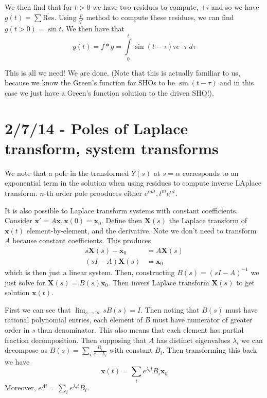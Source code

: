 \documentclass[10pt]{report}
\newcommand{\Res}[0]{\mathrm{Res} }
\begin{document}
We then find that for $t > 0$ we have two residues to compute, $\pm i$ and so we have $g(t) = \sum \Res$. Using $\frac{p}{q'}$ method to compute these residues, we can find $g(t > 0) = \sin t$. We then have that
\begin{equation}
    y(t) = f*g = \displaystyle\int\limits_{0}^{t}\sin(t-\tau) \tau e^-\tau\;d\tau
\end{equation}

This is all we need! We are done. (Note that this is actually familiar to us, because we know the Green's function for SHOs to be $\sin(t-\tau)$ and in this case we just have a Green's function solution to the driven SHO!).


\chapter{2/7/14 - Poles of Laplace transform, system transforms}

We note that a pole in the transformed $Y(s)$ at $s=\alpha$ corresponds to an exponential term in the solution when using residues to compute inverse LAplace transform. $n$-th order pole prooduces either $e^{\alpha at}, t^me^{\alpha t}$.

It is also possible to Laplace transform systems with constant coefficients. Consider $\mathbf{x}' = A\mathbf{x}, \mathbf{x}(0) = \mathbf{x}_0$. Define then $\mathbf{X}(s)$ the Laplace transform of $\mathbf{x}(t)$ element-by-element, and the derivative. Note we don't need to transform $A$ because constant coefficients. This produces
\begin{align}
    s\mathbf{X}(s) - \mathbf{x}_0 &= A\mathbf{X}(s)\\
    (sI - A)\mathbf{X}(s) &= \mathbf{x}_0
\end{align}
which is then just a linear system. Then, constructing $B(s) = (sI - A)^{-1}$ we just solve for $\mathbf{X}(s) = B(s) \mathbf{x}_0$. Then invers Laplace transform $\mathbf{X}(s)$ to get solution $\mathbf{x}(t)$. 

First we can see that $\lim_{s \to \infty}sB(s) = I$. Then noting that $B(s)$ must have rational polynomial entries, each element of $B$ must have numerator of greater order in $s$ than denominator. This also means that each element has partial fraction decomposition. Then supposing that $A$ has distinct eigenvalues $\lambda_i$ we can decompose as $B(s) = \sum_i \frac{B_i}{s-\lambda_i}$ with constant $B_i$. Then transforming this back we have
$$\mathbf{x}(t) = \sum_i e^{\lambda_i t}B_i \mathbf{x}_0$$
Moreover, $e^{At} = \sum_i e^{\lambda_it}B_i$.
\end{document}
